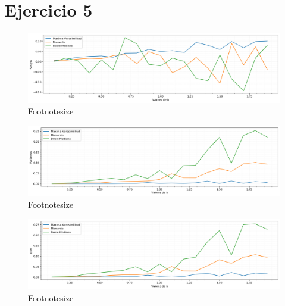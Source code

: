 \section{Ejercicio 5}

\begin{figure}[H]
	\centering
	\includegraphics[width=1\textwidth]{imagenes/sesgos.png}
	\caption{\footnotesize Footnotesize}
\end{figure}

\begin{figure}[H]
	\centering
	\includegraphics[width=1\textwidth]{imagenes/varianzas.png}
	\caption{\footnotesize Footnotesize}
\end{figure}

\begin{figure}[H]
	\centering
	\includegraphics[width=1\textwidth]{imagenes/ecm.png}
	\caption{\footnotesize Footnotesize}
\end{figure}